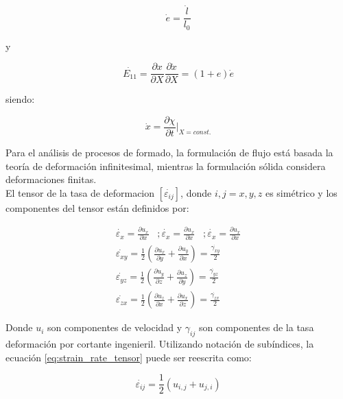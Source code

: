 \begin{equation}
\dot{e} = \frac{\dot{l}}{l_0}
\end{equation}

y 

\begin{equation}
\dot{E_{11}} = \frac{\partial x}{\partial X} \frac{\partial \dot{x}}{\partial X} = 
(1+e)\dot{e}
\end{equation}

siendo:

\begin{equation}
\dot{x} = \frac{\partial \chi}{\partial t} \Big\rvert_{X = const.}
\end{equation}

Para el análisis de procesos de formado, la formulación de flujo está basada la teoría 
de deformación infinitesimal, mientras la formulación sólida considera deformaciones 
finitas. \\

El tensor de la tasa de deformacion $[\dot{\varepsilon_{ij}}]$, donde $i,j = x,y,z$ es simétrico 
y los componentes del tensor están definidos por: 

\begin{eqnarray} \label{eq:strain_rate_tensor}
\dot{\varepsilon_x} = \frac{\partial u_x}{\partial x} \,\,\,\,\, ;
\dot{\varepsilon_x} = \frac{\partial u_x}{\partial x}  \,\,\,\,\, ;
\dot{\varepsilon_x} = \frac{\partial u_x}{\partial x} \\
\dot{\varepsilon_{xy}} = \frac{1}{2} \left( \frac{\partial u_x}{\partial y} + \frac{\partial u_y}{\partial x} \right) = \frac{\dot{\gamma_{xy}}}{2} \\
\dot{\varepsilon_{yz}} = \frac{1}{2} \left( \frac{\partial u_y}{\partial z} + \frac{\partial u_z}{\partial y} \right) = \frac{\dot{\gamma_{yz}}}{2} \\
\dot{\varepsilon_{zx}} = \frac{1}{2} \left( \frac{\partial u_z}{\partial x} + \frac{\partial u_x}{\partial z} \right) = \frac{\dot{\gamma_{zx}}}{2}
\end{eqnarray}

Donde $u_i$ son componentes de velocidad y $\gamma_{ij}$ son componentes de la tasa 
deformación por cortante ingenieril. Utilizando notación de subíndices, la ecuación 
\ref{eq:strain_rate_tensor} puede ser reescrita como:

\begin{equation}
\dot{\varepsilon_{ij}} = \frac{1}{2} \left( u_{i,j} + u_{j,i} \right)
\end{equation}

